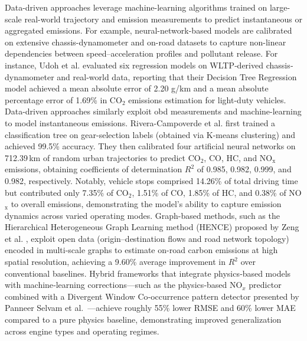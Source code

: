 Data-driven approaches leverage machine-learning algorithms trained on large-scale real-world trajectory and emission measurements to predict instantaneous or aggregated emissions. For example, neural-network-based models are calibrated on extensive chassis-dynamometer and on-road datasets to capture non-linear dependencies between speed–acceleration profiles and pollutant release. \cite{Madziel2023} For instance, Udoh et al. \cite{Udoh2024} evaluated six regression models on WLTP‐derived chassis‐dynamometer and real-world data, reporting that their Decision Tree Regression model achieved a mean absolute error of 2.20 g/km and a mean absolute percentage error of 1.69\% in CO$_2$ emissions estimation for light-duty vehicles. Data-driven approaches similarly exploit \ac{obd} measurements and machine-learning to model instantaneous emissions. Rivera-Campoverde et al. \cite{Rivera2021} first trained a classification tree on gear-selection labels (obtained via K-means clustering) and achieved 99.5\% accuracy. They then calibrated four artificial neural networks on 712.39\,km of random urban trajectories to predict CO$_2$, CO, HC, and NO$_\mathrm{x}$ emissions, obtaining coefficients of determination $R^2$ of 0.985, 0.982, 0.999, and 0.982, respectively. Notably, vehicle stops comprised 14.26\% of total driving time but contributed only 7.35\% of CO$_2$, 1.51\% of CO, 1.85\% of HC, and 0.38\% of NO$_\mathrm{x}$ to overall emissions, demonstrating the model’s ability to capture emission dynamics across varied operating modes. Graph-based methods, such as the Hierarchical Heterogeneous Graph Learning method (HENCE) proposed by Zeng et al. \cite{Zeng2024}, exploit open data (origin–destination flows and road network topology) encoded in multi-scale graphs to estimate on-road carbon emissions at high spatial resolution, achieving a 9.60\% average improvement in \(R^2\) over conventional baselines. Hybrid frameworks that integrate physics‐based models with machine‐learning corrections—such as the physics‐based NO$_x$ predictor combined with a Divergent Window Co‐occurrence pattern detector presented by Panneer Selvam et al.\ \cite{Selvam2025}—achieve roughly 55\% lower RMSE and 60\% lower MAE compared to a pure physics baseline, demonstrating improved generalization across engine types and operating regimes.
\mynewline
